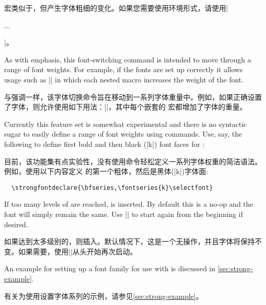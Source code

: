 \documentclass[a4paper]{l3doc}
\begin{document}
宏类似于，但产生字体粗细的变化。如果您需要使用环境形式，请使用|\begin{strongenv}...\end{strongenv}|。

As with emphasis, this font-switching command is intended to move through a range
of font weights. For example, if the fonts are set up correctly it allows usage such as
|| in which each nested  macro increases the
weight of the font.

与强调一样，该字体切换命令旨在移动到一系列字体重量中。例如，如果正确设置了字体，则允许使用如下用法：||，其中每个嵌套的  宏都增加了字体的重量。

\DescribeMacro{\strongfontdeclare}
Currently this feature set is somewhat experimental and there is no syntactic sugar
to easily define a range of font weights using  commands.
Use, say, the following to define first bold and then black (|k|) font faces for :

目前，该功能集有点实验性，没有使用命令轻松定义一系列字体权重的简洁语法。例如，使用以下内容定义  的第一个粗体，然后是黑体(|k|)字体面:

\begin{Verbatim}
  \strongfontdeclare{\bfseries,\fontseries{k}\selectfont}
\end{Verbatim}

\DescribeMacro{\strongreset}
If too many levels of  are reached,  is inserted.
By default this is a no-op and the font will simply remain the same.
Use |{\mdseries}| to start again from the beginning if desired.

如果达到太多级别的，则插入。默认情况下，这是一个无操作，并且字体将保持不变。如果需要，使用|{\mdseries}|从头开始再次启动。

An example for setting up a font family for use with  is discussed in \vref{sec:strong-example}.

有关为使用设置字体系列的示例，请参见\ref{sec:strong-example}。
\end{document}
